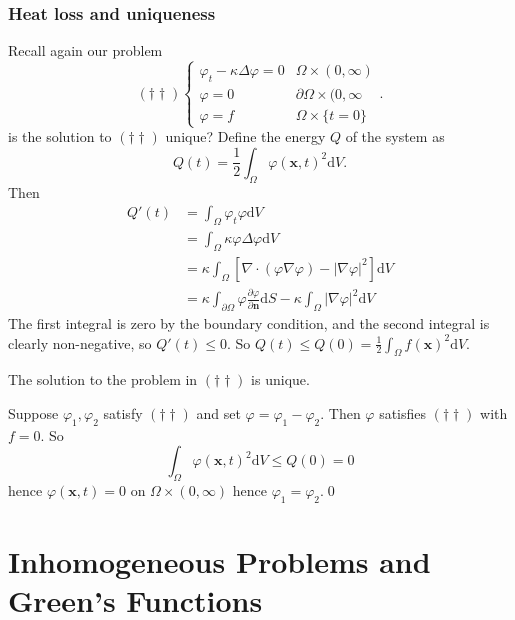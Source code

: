 \documentclass{article}
\begin{document}
\subsubsection{Heat loss and uniqueness}
Recall again our problem
\[
	(\dagger\dagger) \begin{cases}
	  \varphi_t-\kappa\Delta\varphi=0 & \Omega\times (0,\infty) \\
	  \varphi = 0 & \partial\Omega\times (0,\infty \\
	  \varphi = f & \Omega \times \{t=0\}
  \end{cases}.
\]
is the solution to $(\dagger\dagger) $ unique? Define the energy $ Q $ of the system as
\[
	Q(t)=\frac 12\int_\Omega \varphi(\mathbf x,t)^2\mathrm dV.
\]
Then
\begin{align*}
	Q'(t)&=\int_\Omega \varphi_t\varphi\mathrm dV\\
	     &=\int_\Omega \kappa\varphi\Delta\varphi\mathrm dV\\
	     &=\kappa\int_\Omega\left[\nabla\cdot(\varphi\nabla\varphi)-|\nabla\varphi|^2\right]\mathrm dV\\
	     &= \kappa\int_{\partial \Omega}\varphi\frac{\partial \varphi}{\partial \mathbf n}\mathrm dS-\kappa\int_\Omega|\nabla \varphi|^2\mathrm dV
\end{align*}
The first integral is zero by the boundary condition, and the second integral is clearly non-negative, so $ Q'(t)\le 0 $. So $ Q(t)\le Q(0)=\frac 12 \int_\Omega f(\mathbf x)^2\mathrm dV $.
\begin{proposition}
  The solution to the problem in $ (\dagger\dagger) $ is unique.
\end{proposition}
\pf Suppose $ \varphi_1,\varphi_2 $ satisfy $ (\dagger\dagger) $ and set $ \varphi=\varphi_1-\varphi_2 $. Then $ \varphi $ satisfies $ (\dagger\dagger) $ with $ f=0 $. So
\[
  \int_\Omega\varphi(\mathbf x,t)^2\mathrm dV \le Q(0)=0
\]
hence $ \varphi(\mathbf x,t)=0 $ on $ \Omega\times(0,\infty) $ hence $ \varphi_1=\varphi_2 $.\qed
\section{Inhomogeneous Problems and Green's Functions}
\end{document}
